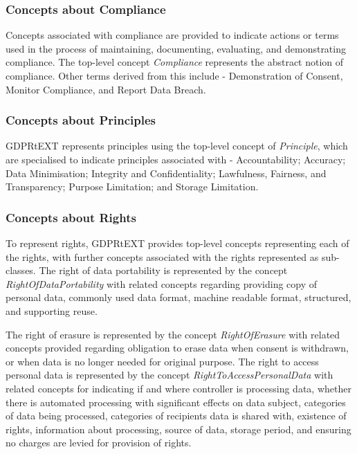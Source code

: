 \subsubsection{Concepts about Compliance}
Concepts associated with compliance are provided to indicate actions or terms used in the process of maintaining, documenting, evaluating, and demonstrating compliance. The top-level concept \textit{Compliance} represents the abstract notion of compliance. Other terms derived from this include - Demonstration of Consent, Monitor Compliance, and Report Data Breach.

\subsubsection{Concepts about Principles}
GDPRtEXT represents principles using the top-level concept of \textit{Principle}, which are specialised to indicate principles associated with - Accountability; Accuracy; Data Minimisation; Integrity and Confidentiality; Lawfulness, Fairness, and Transparency; Purpose Limitation; and Storage Limitation.

\subsubsection{Concepts about Rights}
To represent rights, GDPRtEXT provides top-level concepts representing each of the rights, with further concepts associated with the rights represented as sub-classes. The right of data portability is represented by the concept \textit{RightOfDataPortability} with related concepts regarding providing copy of personal data, commonly used data format, machine readable format, structured, and supporting reuse.

The right of erasure is represented by the concept \textit{RightOfErasure} with related concepts provided regarding obligation to erase data when consent is withdrawn, or when data is no longer needed for original purpose. The right to access personal data is represented by the concept \textit{RightToAccessPersonalData} with related concepts for indicating if and where controller is processing data, whether there is automated processing with significant effects on data subject, categories of data being processed, categories of recipients data is shared with, existence of rights, information about processing, source of data, storage period, and ensuring no charges are levied for provision of rights.

